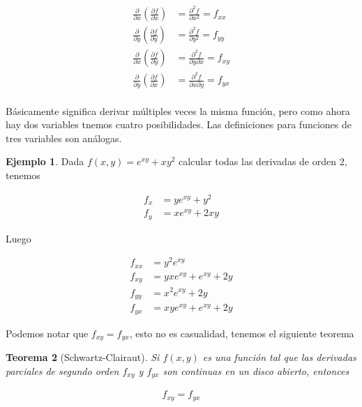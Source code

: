 \documentclass{article}
\theoremstyle{plain}
\newtheorem{thm}{Teorema}[section]
\theoremstyle{definition}
\newtheorem{ejem}[thm]{Ejemplo}
\begin{document}
\begin{align*}
     \frac{\partial}{\partial x} \left( \frac{\partial f}{\partial x} \right)  &=\frac{\partial^2 f}{\partial x^2} = f_{xx} \\
   \frac{\partial}{\partial y} \left( \frac{\partial f}{\partial y} \right) &= \frac{\partial^2 f}{\partial y^2} = f_{yy} \\
   \frac{\partial}{\partial x} \left( \frac{\partial f}{\partial y} \right) &= \frac{\partial^2 f}{\partial y \partial x} = f_{xy} \\
   \frac{\partial}{\partial y} \left( \frac{\partial f}{\partial x} \right) &= \frac{\partial^2 f}{\partial x \partial y} = f_{yx} \\
\end{align*}

Básicamente significa derivar múltiples veces la misma función, pero como ahora hay dos variables tnemos cuatro posibilidades. Las definiciones para funciones de tres variables son análogas. \\

\begin{ejem}Dada $f(x,y) = e^{xy}+ xy^2$ calcular todas las derivadas de orden 2, tenemos
\end{ejem}

\begin{align*}
    f_x &= ye^{xy}+y^2 \\
    f_y &= xe^{xy}+2xy
\end{align*}

Luego

\begin{align*}
    f_{xx} &= y^2e^{xy} \\
    f_{xy} &= yxe^{xy}+e^{xy} + 2y \\
    f_{yy} &=  x^2e^{xy}+2y \\
    f_{yx} &= xye^{xy} +e^{xy} +2y
\end{align*}

Podemos notar que $f_{xy} = f_{yx}$, esto no es casualidad, tenemos el siguiente teorema \\

\begin{thm}[Schwartz-Clairaut]Si $f(x,y)$ es una función tal que las derivadas parciales de segundo orden $f_{xy}$ y $f_{yx}$ son continuas en un disco abierto, entonces
\end{thm}

\begin{align*}
    f_{xy} =f_{yx}
\end{align*}
\end{document}
